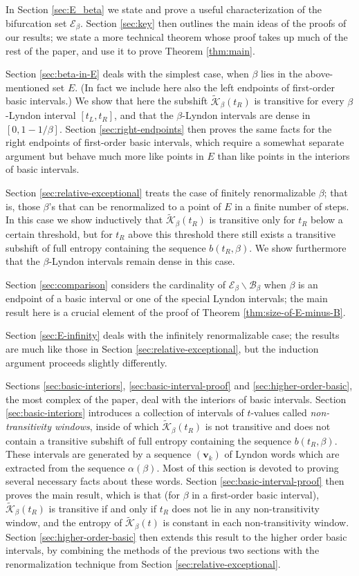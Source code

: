 \documentclass[11pt]{amsart}
\theoremstyle{definition}
\theoremstyle{remark}
\numberwithin{equation}{section}
\newcommand{\BB}{\mathscr{B}}
\newcommand{\EE}{\mathscr{E}}
\newcommand{\Kt}{\widetilde{\mathcal{K}}}
\renewcommand{\v}{\mathbf{v}}
\newcommand{\al}{\alpha}
\begin{document}
In Section \ref{sec:E_beta} we state and prove a useful characterization of the bifurcation set $\EE_\beta$. Section \ref{sec:key} then outlines the main ideas of the proofs of our results; we state a more technical theorem whose proof takes up much of the rest of the paper, and use it to prove Theorem \ref{thm:main}.

Section \ref{sec:beta-in-E} deals with the simplest case, when $\beta$ lies in the above-mentioned set $E$. (In fact we include here also the left endpoints of first-order basic intervals.) We show that here the subshift $\Kt_\beta(t_R)$ is transitive for every $\beta$-Lyndon interval $[t_L,t_R]$, and that the $\beta$-Lyndon intervals are dense in $[0,1-1/\beta]$. Section \ref{sec:right-endpoints} then proves the same facts for the right endpoints of first-order basic intervals, which require a somewhat separate argument but behave much more like points in $E$ than like points in the interiors of basic intervals.

Section \ref{sec:relative-exceptional} treats the case of finitely renormalizable $\beta$; that is, those $\beta$'s that can be renormalized to a point of $E$ in a finite number of steps. In this case we show inductively that $\Kt_\beta(t_R)$ is transitive only for $t_R$ below a certain threshold, but for $t_R$ above this threshold there still exists a transitive subshift of full entropy containing the sequence $b(t_R,\beta)$. We show furthermore that the $\beta$-Lyndon intervals remain dense in this case.

Section \ref{sec:comparison} considers the cardinality of $\EE_\beta\backslash\BB_\beta$ when $\beta$ is an endpoint of a basic interval or one of the special Lyndon intervals; the main result here is a crucial element of the proof of Theorem \ref{thm:size-of-E-minus-B}.

Section \ref{sec:E-infinity} deals with the infinitely renormalizable case; the results are much like those in Section \ref{sec:relative-exceptional}, but the induction argument proceeds slightly differently.

Sections \ref{sec:basic-interiors}, \ref{sec:basic-interval-proof} and \ref{sec:higher-order-basic}, the most complex of the paper, deal with the interiors of basic intervals. Section \ref{sec:basic-interiors} introduces a collection of intervals of $t$-values called {\em non-transitivity windows}, inside of which $\Kt_\beta(t_R)$ is not transitive and does not contain a transitive subshift of full entropy containing the sequence $b(t_R,\beta)$. These intervals are generated by a sequence $(\v_k)$ of Lyndon words which are extracted from the sequence $\al(\beta)$. Most of this section is devoted to proving several necessary facts about these words. Section \ref{sec:basic-interval-proof} then proves the main result, which is that (for $\beta$ in a first-order basic interval), $\Kt_\beta(t_R)$ is transitive if and only if $t_R$ does not lie in any non-transitivity window, and the entropy of $\Kt_\beta(t)$ is constant in each non-transitivity window. Section \ref{sec:higher-order-basic} then extends this result to the higher order basic intervals, by combining the methods of the previous two sections with the renormalization technique from Section \ref{sec:relative-exceptional}.
\end{document}
